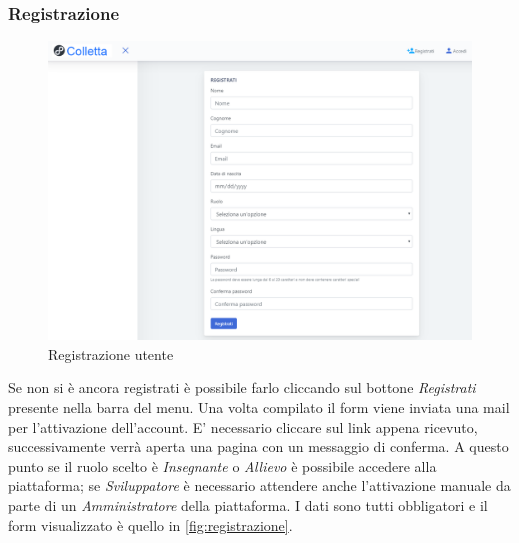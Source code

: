     \subsubsection{Registrazione}
    	\begin{figure}[H]
        	\centering
        	\includegraphics[width=1\linewidth]{sez/img/autenticazione/formRegistrazione.PNG} 
        	\caption{Registrazione utente}\label{fig:registrazione}
    	\end{figure}
	   Se non si è ancora registrati è possibile farlo cliccando sul bottone \textit{Registrati} presente nella barra del menu. Una volta compilato il {form} viene inviata una mail per l'attivazione dell'account. E' necessario cliccare sul link appena ricevuto, successivamente verrà aperta una pagina con un messaggio di conferma. A questo punto se il ruolo scelto è \textit{Insegnante} o \textit{Allievo} è possibile accedere alla piattaforma; se \textit{Sviluppatore} è necessario attendere anche l'attivazione manuale da parte di un  \textit{Amministratore} della piattaforma. I dati sono tutti obbligatori e il form visualizzato è quello in \autoref{fig:registrazione}.

